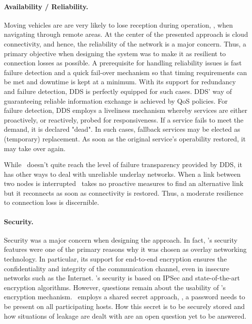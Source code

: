 \paragraph{Availability / Reliability.}
Moving vehicles are are very likely to lose reception during operation, \eg , when navigating through remote areas. At the center of the presented approach is cloud connectivity, and hence, the reliability of the network is a major concern. Thus, a primary objective when designing the system was to make it as resilient to connection losses as possible. A prerequisite for handling reliability issues is fast failure detection and a quick fail-over mechanism so that timing requirements can be met and downtime is kept at a minimum. With its support for redundancy and failure detection, DDS is perfectly equipped for such cases. DDS' way of guaranteeing reliable information exchange is achieved by QoS policies. For failure detection, DDS employs a liveliness mechanism whereby services are either proactively, or reactively, probed for responsiveness. If a service fails to meet the demand, it is declared "dead". In such cases, fallback services may be elected as (temporary) replacement. As soon as the original service's operability restored, it may take over again.

While \wnet\ doesn't quite reach the level of failure transparency provided by DDS, it has other ways to deal with unreliable underlay networks. When a link between two nodes is interrupted \weave\ takes no proactive measures to find an alternative link but it reconnects as soon as connectivity is restored. Thus, a moderate resilience to connection loss is discernible.

\paragraph{Security.}
Security was a major concern when designing the approach. In fact, \weave 's security features were one of the primary reasons why it was chosen as overlay networking technology. In particular, its support for end-to-end encryption ensures the confidentiality and integrity of the communication channel, even in insecure networks such as the Internet. \wnet 's security is based on IPSec and state-of-the-art encryption algorithms. However, questions remain about the usability of \weave 's encryption mechanism. \weave\ employs a shared secret approach, \ie , a password needs to be present on all participating hosts. How this secret is to be securely stored and how situations of leakage are dealt with are an open question yet to be answered.

